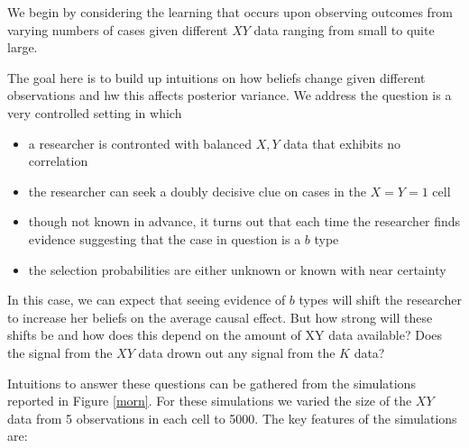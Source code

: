 \documentclass[12pt,]{book}
\providecommand{\tightlist}{%
  \setlength{\itemsep}{0pt}\setlength{\parskip}{0pt}}
\begin{document}
We begin by considering the learning that occurs upon observing outcomes from varying numbers of cases given different \(XY\) data ranging from small to quite large.

The goal here is to build up intuitions on how beliefs change given different observations and hw this affects posterior variance. We address the question is a very controlled setting in which

\begin{itemize}
\tightlist
\item
  a researcher is contronted with balanced \(X,Y\) data that exhibits no correlation
\item
  the researcher can seek a doubly decisive clue on cases in the \(X=Y=1\) cell
\item
  though not known in advance, it turns out that each time the researcher finds evidence suggesting that the case in question is a \(b\) type
\item
  the selection probabilities are either unknown or known with near certainty
\end{itemize}

In this case, we can expect that seeing evidence of \(b\) types will shift the researcher to increase her beliefs on the average causal effect. But how strong will these shifts be and how does this depend on the amount of XY data available? Does the signal from the \(XY\) data drown out any signal from the \(K\) data?

Intuitions to answer these questions can be gathered from the simulations reported in Figure \ref{morn}. For these simulations we varied the size of the \(XY\) data from 5 observations in each cell to 5000. The key features of the simulations are:
\end{document}
